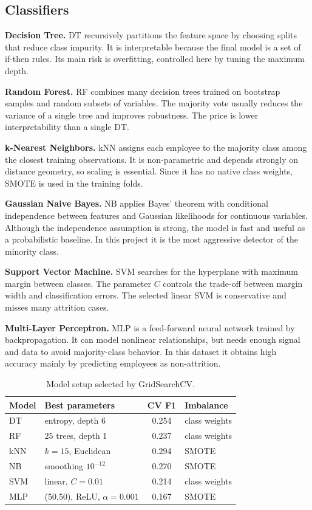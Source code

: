 \documentclass[lettersize,journal]{IEEEtran}
\begin{document}
\subsection{Classifiers}
\textbf{Decision Tree.} DT recursively partitions the feature space by choosing splits that reduce class impurity. It is interpretable because the final model is a set of if-then rules. Its main risk is overfitting, controlled here by tuning the maximum depth.

\textbf{Random Forest.} RF combines many decision trees trained on bootstrap samples and random subsets of variables. The majority vote usually reduces the variance of a single tree and improves robustness. The price is lower interpretability than a single DT.

\textbf{k-Nearest Neighbors.} kNN assigns each employee to the majority class among the closest training observations. It is non-parametric and depends strongly on distance geometry, so scaling is essential. Since it has no native class weights, SMOTE is used in the training folds.

\textbf{Gaussian Naive Bayes.} NB applies Bayes' theorem with conditional independence between features and Gaussian likelihoods for continuous variables. Although the independence assumption is strong, the model is fast and useful as a probabilistic baseline. In this project it is the most aggressive detector of the minority class.

\textbf{Support Vector Machine.} SVM searches for the hyperplane with maximum margin between classes. The parameter $C$ controls the trade-off between margin width and classification errors. The selected linear SVM is conservative and misses many attrition cases.

\textbf{Multi-Layer Perceptron.} MLP is a feed-forward neural network trained by backpropagation. It can model nonlinear relationships, but needs enough signal and data to avoid majority-class behavior. In this dataset it obtains high accuracy mainly by predicting employees as non-attrition.

\begin{table}[t]
\caption{Model setup selected by GridSearchCV.}
\label{tab:setup}
\centering
\scriptsize
\setlength{\tabcolsep}{3pt}
\begin{tabular}{lp{}cp{}}
\toprule
Model & Best parameters & CV F1 & Imbalance \\
\midrule
DT  & entropy, depth 6 & 0.254 & class weights \\
RF  & 25 trees, depth 1 & 0.237 & class weights \\
kNN & $k=15$, Euclidean & 0.294 & SMOTE \\
NB  & smoothing $10^{-12}$ & 0.270 & SMOTE \\
SVM & linear, $C=0.01$ & 0.214 & class weights \\
MLP & (50,50), ReLU, $\alpha=0.001$ & 0.167 & SMOTE \\
\bottomrule
\end{tabular}
\end{table}
\end{document}
